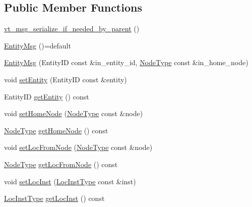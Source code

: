 \subsection*{Public Member Functions}
\begin{DoxyCompactItemize}
\item 
\hyperlink{structvt_1_1location_1_1_entity_msg_ac7426fc8a8631a33f16b389f489631c2}{vt\+\_\+msg\+\_\+serialize\+\_\+if\+\_\+needed\+\_\+by\+\_\+parent} ()
\item 
\hyperlink{structvt_1_1location_1_1_entity_msg_a962b4711acd88b3be14cde800dcfe967}{Entity\+Msg} ()=default
\item 
\hyperlink{structvt_1_1location_1_1_entity_msg_a20a8679b67ce88ab88d2fd915dae6d23}{Entity\+Msg} (Entity\+ID const \&in\+\_\+entity\+\_\+id, \hyperlink{namespacevt_a866da9d0efc19c0a1ce79e9e492f47e2}{Node\+Type} const \&in\+\_\+home\+\_\+node)
\item 
void \hyperlink{structvt_1_1location_1_1_entity_msg_a76a6b14309f9a20a0b6cd2afa9a80917}{set\+Entity} (Entity\+ID const \&entity)
\item 
Entity\+ID \hyperlink{structvt_1_1location_1_1_entity_msg_af288322a731d03cea544bc2e60bb10bd}{get\+Entity} () const
\item 
void \hyperlink{structvt_1_1location_1_1_entity_msg_af2111f7feda34a83a2132d396647f77f}{set\+Home\+Node} (\hyperlink{namespacevt_a866da9d0efc19c0a1ce79e9e492f47e2}{Node\+Type} const \&node)
\item 
\hyperlink{namespacevt_a866da9d0efc19c0a1ce79e9e492f47e2}{Node\+Type} \hyperlink{structvt_1_1location_1_1_entity_msg_a5f0675e4fca11168fee86e8af122e289}{get\+Home\+Node} () const
\item 
void \hyperlink{structvt_1_1location_1_1_entity_msg_afd28b1e836177cb58d112b25edce1210}{set\+Loc\+From\+Node} (\hyperlink{namespacevt_a866da9d0efc19c0a1ce79e9e492f47e2}{Node\+Type} const \&node)
\item 
\hyperlink{namespacevt_a866da9d0efc19c0a1ce79e9e492f47e2}{Node\+Type} \hyperlink{structvt_1_1location_1_1_entity_msg_a38c36e0dd8a9207defaf44458a151d61}{get\+Loc\+From\+Node} () const
\item 
void \hyperlink{structvt_1_1location_1_1_entity_msg_a7bbd80a3e29d729cd7be84acb167ff90}{set\+Loc\+Inst} (\hyperlink{namespacevt_1_1location_a4db6456e8024af2d23fc5ae560fef866}{Loc\+Inst\+Type} const \&inst)
\item 
\hyperlink{namespacevt_1_1location_a4db6456e8024af2d23fc5ae560fef866}{Loc\+Inst\+Type} \hyperlink{structvt_1_1location_1_1_entity_msg_a9393448a6cadfde96c2eab29d28b3e5b}{get\+Loc\+Inst} () const

\end{DoxyCompactItemize}
